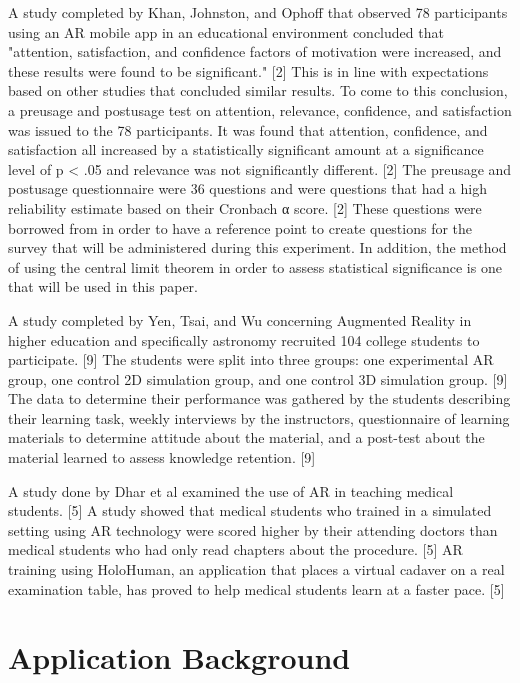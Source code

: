 \documentclass{vgtc}                          %
\begin{document}
	A study completed by Khan, Johnston, and Ophoff that observed 78 participants using an AR mobile app in an educational environment concluded that "attention, satisfaction, and confidence factors of motivation were increased, and these results were found to be significant." [2] This is in line with expectations based on other studies that concluded similar results. To come to this conclusion, a preusage and postusage test on attention, relevance, confidence, and satisfaction was issued to the 78 participants. It was found that attention, confidence, and satisfaction all increased by a statistically significant amount at a significance level of p < .05 and relevance was not significantly different. [2] The preusage and postusage questionnaire were 36 questions and were questions that had a high reliability estimate based on their Cronbach α score. [2] These questions were borrowed from in order to have a reference point to create questions for the survey that will be administered during this experiment. In addition, the method of using the central limit theorem in order to assess statistical significance is one that will be used in this paper.
\vspace*{4mm}


	A study completed by Yen, Tsai, and Wu concerning Augmented Reality in higher education and specifically astronomy recruited 104 college students to participate. [9] The students were split into three groups: one experimental AR group, one control 2D simulation group, and one control 3D simulation group. [9] The data to determine their performance was gathered by the students describing their learning task, weekly interviews by the instructors, questionnaire of learning materials to determine attitude about the material, and a post-test about the material learned to assess knowledge retention. [9] 
\vspace*{4mm}

	A study done by Dhar et al examined the use of AR in teaching medical students. [5] A study showed that medical students who trained in a simulated setting using AR technology were scored higher by their attending doctors than medical students who had only read chapters about the procedure. [5] AR training using HoloHuman, an application that places a virtual cadaver on a real examination table, has proved to help medical students learn at a faster pace. [5]


\section{Application Background}
\end{document}
